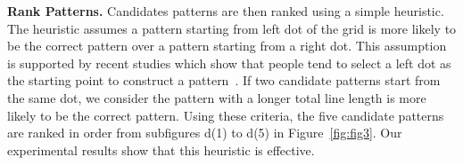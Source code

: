        \noindent \textbf{Rank Patterns.} Candidates patterns are then ranked using a simple
        heuristic. The heuristic assumes a pattern starting from
        left dot of the grid is more likely to be the correct pattern over a
         pattern starting from a right dot. This assumption is supported
        by recent studies which show that people tend to select a left dot as the starting point
        to construct a pattern~\cite{uellenbeck2013quantifying,alpnorway}.
         If two candidate patterns
         start from the same dot, we consider the pattern with a
        longer total line length
        is more likely to be the correct pattern. Using these criteria,
        the five candidate patterns are ranked in order from subfigures d(1) to d(5) in
        Figure~\ref{fig:fig3}.
        Our experimental results show that
        this heuristic is effective.


